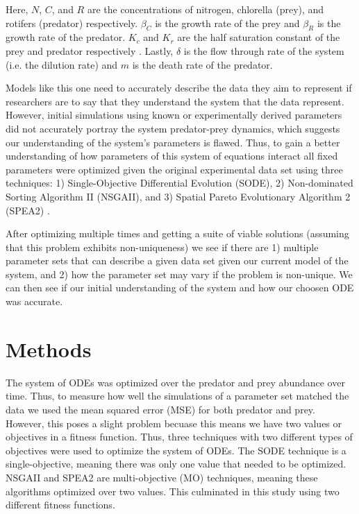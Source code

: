 \documentclass[twocolumn, 9pt]{article}
\begin{document}
Here, $N$, $C$, and $R$ are the concentrations of nitrogen, chlorella (prey), and rotifers (predator) respectively. $\beta_C$ is the growth rate of the prey and $\beta_R$ is the growth rate of the predator. $K_c$ and $K_r$ are the half saturation constant of the prey and predator respectively \cite{fussmann_crossing_2000}. Lastly, $\delta$ is the flow through rate of the system (i.e. the dilution rate) and $m$ is the death rate of the predator.  

Models like this one need to accurately describe the data they aim to represent if researchers are to say that they understand the system that the data represent. However, initial simulations using known or experimentally derived parameters did not accurately portray the system predator-prey dynamics, which suggests our understanding of the system's parameters is flawed. Thus, to gain a better understanding of how parameters of this system of equations interact all fixed parameters were optimized given the original experimental data set using three techniques: 1) Single-Objective Differential Evolution (SODE), 2) Non-dominated Sorting Algorithm II (NSGAII), and 3) Spatial Pareto Evolutionary Algorithm 2 (SPEA2) \cite{deb_fast_2002, zitzler_spea2:_nodate}.

After optimizing multiple times and getting a suite of viable solutions (assuming that this problem exhibits non-uniqueness) we see if there are 1) multiple parameter sets that can describe a given data set given our current model of the system, and 2) how the parameter set may vary if the problem is non-unique. We can then see if our initial understanding of the system and how our choosen ODE was accurate.   

\section{Methods}

\indent{} The system of ODEs was optimized over the predator and prey abundance over time. Thus, to measure how well the simulations of a parameter set matched the data we used the mean squared error (MSE) for both predator and prey. However, this poses a slight problem becuase this means we have two values or objectives in a fitness function. Thus, three techniques with two different types of objectives were used to optimize the system of ODEs. The SODE technique is a single-objective, meaning there was only one value that needed to be optimized. NSGAII and SPEA2 are multi-objective (MO) techniques, meaning these algorithms optimized over two values. This culminated in this study using two different fitness functions. 
\end{document}
